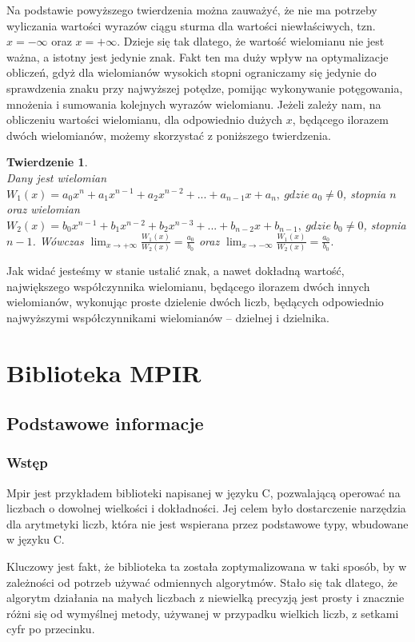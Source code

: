 \documentclass[twoside,a4paper]{book}
\newtheorem{theorem}{Twierdzenie}
\begin{document}
Na podstawie powyższego twierdzenia można zauważyć, że nie ma potrzeby wyliczania wartości wyrazów ciągu sturma dla wartości niewłaściwych, tzn. $x=-\infty$ oraz $x=+\infty.$ Dzieje się tak dlatego, że wartość wielomianu nie jest ważna, a istotny jest jedynie znak. Fakt ten ma duży wpływ na optymalizacje obliczeń, gdyż dla wielomianów wysokich stopni ograniczamy się jedynie do sprawdzenia znaku przy najwyższej potędze, pomijąc wykonywanie potęgowania, mnożenia i sumowania kolejnych wyrazów wielomianu.
Jeżeli zależy nam, na obliczeniu wartości wielomianu, dla odpowiednio dużych $x$, będącego ilorazem dwóch wielomianów, możemy skorzystać z poniższego twierdzenia.

\begin{theorem}
	$ $ \\
	Dany jest wielomian $W_1(x) = a_0x^n + a_1x^{n-1} + a_2x^{n-2} + ... + a_{n-1}x + a_n,\ gdzie \ a_0 \ne 0$, stopnia $n$ oraz wielomian $W_2(x) = b_0x^{n-1} + b_1x^{n-2} + b_2x^{n-3} + ... + b_{n-2}x + b_{n-1},\ gdzie\ b_0 \ne 0$, stopnia $n-1$. Wówczas $\lim_{x \to +\infty}\frac{W_1(x)}{W_2(x)} = \frac{a_0}{b_0}$ oraz $\lim_{x \to -\infty}\frac{W_1(x)}{W_2(x)} = \frac{a_0}{b_0}.$
\end{theorem}

Jak widać jesteśmy w stanie ustalić znak, a nawet dokładną wartość, największego współczynnika wielomianu, będącego ilorazem dwóch innych wielomianów, wykonując proste dzielenie dwóch liczb, będących odpowiednio najwyższymi współczynnikami wielomianów -- dzielnej i dzielnika.

\section{Biblioteka MPIR}

\subsection{Podstawowe informacje}

\subsubsection{Wstęp}

Mpir jest przykładem biblioteki napisanej w języku C, pozwalającą operować na liczbach o dowolnej wielkości i dokładności. Jej celem było dostarczenie narzędzia dla arytmetyki liczb, która nie jest wspierana przez podstawowe typy, wbudowane w języku C.

Kluczowy jest fakt, że biblioteka ta została zoptymalizowana w taki sposób, by w zależności od potrzeb używać odmiennych algorytmów. Stało się tak dlatego, że algorytm działania na małych liczbach z niewielką precyzją jest prosty i znacznie różni się od wymyślnej metody, używanej w przypadku wielkich liczb, z setkami cyfr po przecinku.
\end{document}
